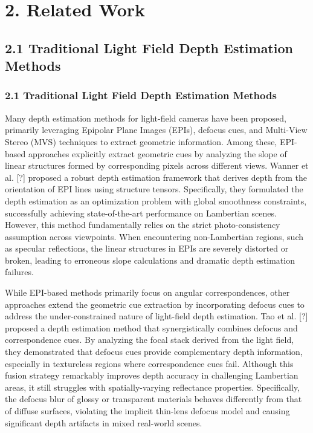 \section{2. Related Work}

\subsection{2.1 Traditional Light Field Depth Estimation Methods}

\subsubsection{2.1 Traditional Light Field Depth Estimation Methods}

Many depth estimation methods for light-field cameras have been proposed, primarily leveraging Epipolar Plane Images (EPIs), defocus cues, and Multi-View Stereo (MVS) techniques to extract geometric information. Among these, EPI-based approaches explicitly extract geometric cues by analyzing the slope of linear structures formed by corresponding pixels across different views. Wanner et al. [?] proposed a robust depth estimation framework that derives depth from the orientation of EPI lines using structure tensors. Specifically, they formulated the depth estimation as an optimization problem with global smoothness constraints, successfully achieving state-of-the-art performance on Lambertian scenes. However, this method fundamentally relies on the strict photo-consistency assumption across viewpoints. When encountering non-Lambertian regions, such as specular reflections, the linear structures in EPIs are severely distorted or broken, leading to erroneous slope calculations and dramatic depth estimation failures.

While EPI-based methods primarily focus on angular correspondences, other approaches extend the geometric cue extraction by incorporating defocus cues to address the under-constrained nature of light-field depth estimation. Tao et al. [?] proposed a depth estimation method that synergistically combines defocus and correspondence cues. By analyzing the focal stack derived from the light field, they demonstrated that defocus cues provide complementary depth information, especially in textureless regions where correspondence cues fail. Although this fusion strategy remarkably improves depth accuracy in challenging Lambertian areas, it still struggles with spatially-varying reflectance properties. Specifically, the defocus blur of glossy or transparent materials behaves differently from that of diffuse surfaces, violating the implicit thin-lens defocus model and causing significant depth artifacts in mixed real-world scenes.

